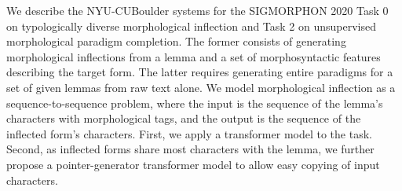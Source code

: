 We describe the NYU-CUBoulder systems for the SIGMORPHON 2020 Task 0 on typologically diverse morphological inflection and Task 2 on unsupervised morphological paradigm completion. The former consists of generating morphological inflections from a lemma and a set of morphosyntactic features describing the target form. The latter requires generating entire paradigms for a set of given lemmas from raw text alone. We model morphological inflection as a sequence-to-sequence problem, where the input is the sequence of the lemma's characters with morphological tags, and the output is the sequence of the inflected form's characters. First, we apply a transformer model to the task. Second, as inflected forms share most characters with the lemma, we further propose a pointer-generator transformer model to allow easy copying of input characters.
